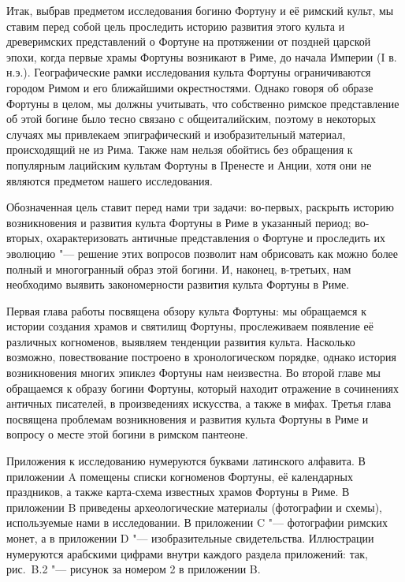 Итак, выбрав предметом исследования богиню Фортуну и её римский культ, мы ставим перед собой цель проследить историю развития этого культа и древеримских представлений о Фортуне на протяжении от поздней царской эпохи, когда первые храмы Фортуны возникают в Риме, до начала Империи (I в. н.э.). Географические рамки исследования культа Фортуны ограничиваются городом Римом и его ближайшими окрестностями. Однако говоря об образе Фортуны в целом, мы должны учитывать, что собственно римское представление об этой богине было тесно связано с общеиталийским, поэтому в некоторых случаях мы привлекаем эпиграфический и изобразительный материал, происходящий не из Рима. Также нам нельзя обойтись без обращения к популярным лацийским культам Фортуны в Пренесте и Анции, хотя они не являются предметом нашего исследования.

Обозначенная цель ставит перед нами три задачи: во-первых, раскрыть историю возникновения и развития культа Фортуны в Риме в указанный период; во-вторых, охарактеризовать античные представления о Фортуне и проследить их эволюцию "--- решение этих вопросов позволит нам обрисовать как можно более полный и многогранный образ этой богини. И, наконец, в-третьих, нам необходимо выявить закономерности развития культа Фортуны в Риме.

Первая глава работы посвящена обзору культа Фортуны: мы обращаемся к истории создания храмов и святилищ Фортуны, прослеживаем появление её различных когноменов, выявляем тенденции развития культа. Насколько возможно, повествование построено в хронологическом порядке, однако история возникновения многих эпиклез Фортуны нам неизвестна. Во второй главе мы обращаемся к образу богини Фортуны, который находит отражение в сочинениях античных писателей, в произведениях искусства, а также в мифах. Третья глава посвящена проблемам возникновения и развития культа Фортуны в Риме и вопросу о месте этой богини в римском пантеоне.

Приложения к исследованию нумеруются буквами латинского алфавита. В приложении A помещены списки когноменов Фортуны, её календарных праздников, а также карта-схема известных храмов Фортуны в Риме. В приложении B приведены археологические материалы (фотографии и схемы), используемые нами в исследовании. В приложении C "--- фотографии римских монет, а в приложении D "--- изобразительные свидетельства. Иллюстрации нумеруются арабскими цифрами внутри каждого раздела приложений: так, рис.~B.2 "--- рисунок за номером 2 в приложении B.


